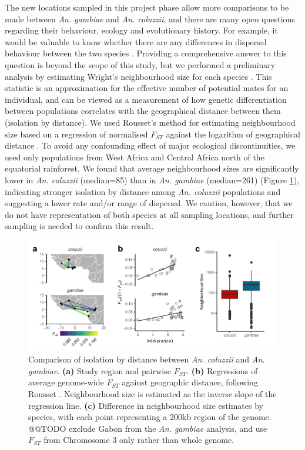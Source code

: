 \documentclass[a4paper,11pt,abstracton,hidelinks]{scrartcl}
\begin{document}
%
The new locations sampled in this project phase allow more comparisons to be made between \textit{An. gambiae} and \textit{An. coluzzii}, and there are many open questions regarding their behaviour, ecology and evolutionary history.
%
For example, it would be valuable to know whether there are any differences in dispersal behaviour between the two species \cite{dao2014, north2019}. 
%
Providing a comprehensive answer to this question is beyond the scope of this study, but we performed a preliminary analysis by estimating Wright's neighbourhood size for each species \cite{wright1946}.
%
This statistic is an approximation for the effective number of potential mates for an individual, and can be viewed as a measurement of how genetic differentiation between populations correlates with the geographical distance between them (isolation by distance).
%
We used Rousset's method for estimating neighbourhood size based on a regression of normalised $F_{ST}$ against the logarithm of geographical distance \cite{rousset1997genetic}.
%
To avoid any confounding effect of major ecological discontinuities, we used only populations from West Africa and Central Africa north of the equatorial rainforest.
%
We found that average neighbourhood sizes are significantly lower in \textit{An. coluzzii} (median=85) than in \textit{An. gambiae} (median=261) (Figure \ref{fig:isolation}), indicating stronger isolation by distance among \textit{An. coluzzii} populations and suggesting a lower rate and/or range of dispersal.
%
We caution, however, that we do not have representation of both species at all sampling locations, and further sampling is needed to confirm this result.


\begin{figure}[H]
	\begin{center}
		\includegraphics*[width=6.3in]{artwork/west_africa_multipanel_edit_NOD.pdf}
	\end{center}
	\caption{Comparison of isolation by distance between \textit{An. coluzzii} and \textit{An. gambiae}. \textbf{(a)} Study region and pairwise $F_{ST}$. \textbf{(b)} Regressions of average genome-wide $F_{ST}$ against geographic distance, following Rousset \cite{rousset1997genetic}. Neighbourhood size is estimated as the inverse slope of the regression line. \textbf{(c)} Difference in neighbourhood size estimates by species, with each point representing a 200kb region of the genome. @@TODO exclude Gabon from the \textit{An. gambiae} analysis, and use $F_{ST}$ from Chromosome 3 only rather than whole genome.}
	\label{fig:isolation}
\end{figure}
\end{document}
